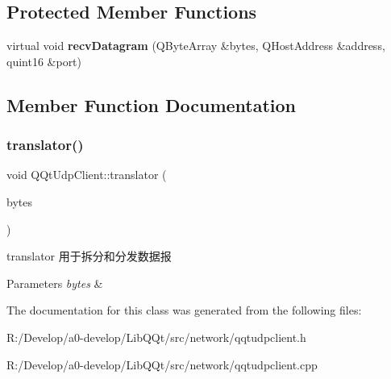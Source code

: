 \subsection*{Protected Member Functions}
\begin{DoxyCompactItemize}
\item 
\mbox{\label{class_q_qt_udp_client_a75439743606f5f73195e975fe9206c0e}} 
virtual void {\bfseries recv\+Datagram} (Q\+Byte\+Array \&bytes, Q\+Host\+Address \&address, quint16 \&port)
\end{DoxyCompactItemize}


\subsection{Member Function Documentation}
\mbox{\label{class_q_qt_udp_client_a231ee307f41a4a32f8709fdb9ec9bb55}} 
\subsubsection{\texorpdfstring{translator()}{translator()}}
{\footnotesize\ttfamily void Q\+Qt\+Udp\+Client\+::translator (\begin{DoxyParamCaption}\item[{const Q\+Byte\+Array \&}]{bytes }\end{DoxyParamCaption})}



translator 用于拆分和分发数据报 


\begin{DoxyParams}{Parameters}
{\em bytes} & \\
\hline
\end{DoxyParams}


The documentation for this class was generated from the following files\+:\begin{DoxyCompactItemize}
\item 
R\+:/\+Develop/a0-\/develop/\+Lib\+Q\+Qt/src/network/qqtudpclient.\+h\item 
R\+:/\+Develop/a0-\/develop/\+Lib\+Q\+Qt/src/network/qqtudpclient.\+cpp\end{DoxyCompactItemize}
